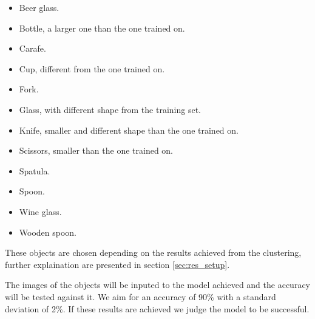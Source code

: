\begin{itemize}
	\item Beer glass.
	\item Bottle, a larger one than the one trained on.
	\item Carafe.
	\item Cup, different from the one trained on.
	\item Fork.
	\item Glass, with different shape from the training set.
	\item Knife, smaller and different shape than the one trained on.
	\item Scissors, smaller than the one trained on.
	\item Spatula.
	\item Spoon.
	\item Wine glass.
	\item Wooden spoon.
\end{itemize}

These objects are chosen depending on the results achieved from the clustering, further explaination are presented in section \ref{sec:res_setup}.

The images of the objects will be inputed to the model achieved and the accuracy will be tested against it. We aim for an accuracy of 90\% with a standard deviation of 2\%. If these results are achieved we judge the model to be successful.


